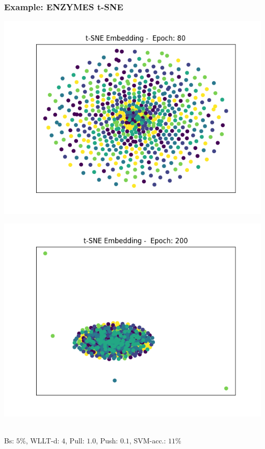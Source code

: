 \begin{frame}\frametitle{Example: ENZYMES t-SNE}
	\begin{minipage}{0.49\textwidth}
		\includegraphics[width=\textwidth]{images/plot16tSNE}
	\end{minipage}
	\begin{minipage}{0.49\textwidth}
		\includegraphics[width=\textwidth]{images/plot17tSNE}
	\end{minipage}
	\vspace{2cm} \\
	\tiny{Bs: $5\%$, WLLT-d: $4$, Pull: $1.0$, Push: $0.1$, SVM-acc.: $11\%$}
\end{frame}


